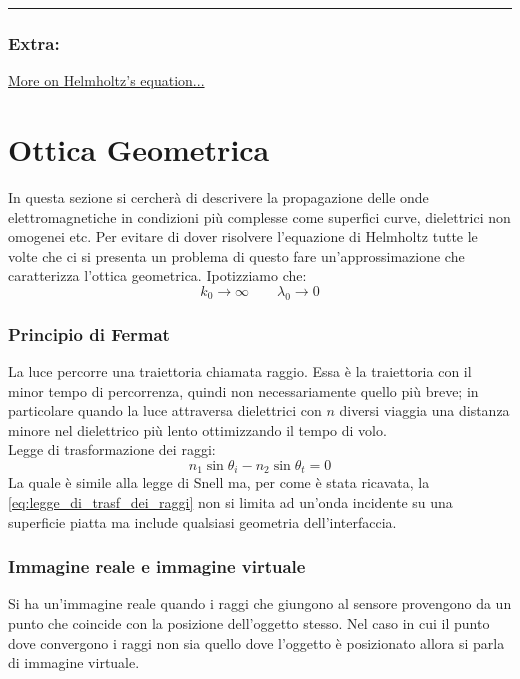 \documentclass{article}
\theoremstyle{remark}
\begin{document}
\vfill
\hrule
\subsubsection*{Extra:}
\href{https://physics.stackexchange.com/questions/334084/wave-vs-helmholtz-equation}{More on Helmholtz's equation...}

\newpage

\section*{Ottica Geometrica}
In questa sezione si cercherà di descrivere la propagazione delle onde elettromagnetiche in condizioni più complesse come superfici curve, dielettrici non omogenei etc.
Per evitare di dover risolvere l'equazione di Helmholtz tutte le volte che ci si presenta un problema di questo fare un'approssimazione che caratterizza l'ottica geometrica.
Ipotizziamo che:
\begin{equation*}
k_0 \rightarrow \infty \qquad \lambda_0 \rightarrow 0
\end{equation*}
\subsubsection*{Principio di Fermat}
La luce percorre una traiettoria chiamata raggio. Essa è la traiettoria con il minor tempo di percorrenza, quindi non necessariamente quello più breve; in particolare quando la luce attraversa dielettrici con $n$ diversi viaggia una distanza minore nel dielettrico più lento ottimizzando il tempo di volo.\\
Legge di trasformazione dei raggi:
\begin{equation}	\label{eq:legge_di_trasf_dei_raggi}
n_1 \sin\theta_i - n_2 \sin\theta_t = 0
\end{equation}
La quale è simile alla legge di Snell ma, per come è stata ricavata, la \eqref{eq:legge_di_trasf_dei_raggi} non si limita ad un'onda incidente su una superficie piatta ma include qualsiasi geometria dell'interfaccia.

\subsubsection*{Immagine reale e immagine virtuale}
Si ha un'immagine reale quando i raggi che giungono al sensore provengono da un punto che coincide con la posizione dell'oggetto stesso. Nel caso in cui il punto dove convergono i raggi non sia quello dove l'oggetto è posizionato allora si parla di immagine virtuale.
\end{document}
